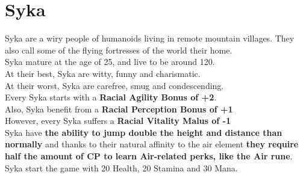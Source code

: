 \section{Syka}\label{race:syka}
Syka are a wiry people of humanoids living in remote mountain villages.
They also call some of the flying fortresses of the world their home.\\
Syka mature at the age of 25, and live to be around 120.\\
At their best, Syka are witty, funny and charismatic.\\
At their worst, Syka are carefree, smug and condescending.\\
Every Syka starts with a \textbf{Racial Agility Bonus of +2}.\\
Also, Syka benefit from a \textbf{Racial Perception Bonus of +1}\\
However, every Syka suffers a \textbf{Racial Vitality Malus of -1}\\
Syka have \textbf{the ability to jump double the height and distance than normally} and thanks to their natural affinity to the air element \textbf{they require half the amount of CP to learn Air-related perks, like the Air rune}.\\
Syka start the game with 20 Health, 20 Stamina and 30 Mana.